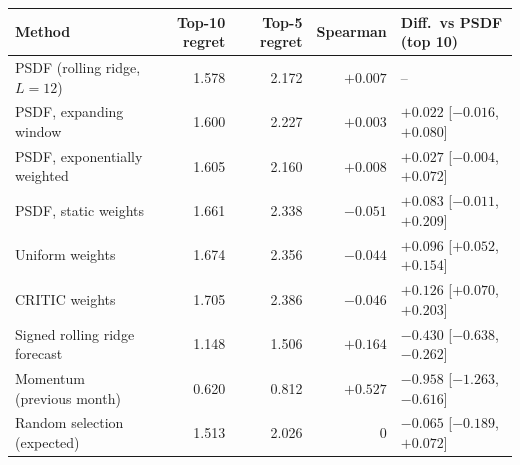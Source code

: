 \begin{tabular}{lrrrl}
\toprule
Method & Top-10 regret & Top-5 regret & Spearman & Diff.\ vs PSDF (top 10) \\
\midrule
PSDF (rolling ridge, $L=12$) & 1.578 & 2.172 & $+0.007$ & -- \\
PSDF, expanding window & 1.600 & 2.227 & $+0.003$ & $+0.022$ [$-0.016$, $+0.080$] \\
PSDF, exponentially weighted & 1.605 & 2.160 & $+0.008$ & $+0.027$ [$-0.004$, $+0.072$] \\
PSDF, static weights & 1.661 & 2.338 & $-0.051$ & $+0.083$ [$-0.011$, $+0.209$] \\
Uniform weights & 1.674 & 2.356 & $-0.044$ & $+0.096$ [$+0.052$, $+0.154$] \\
CRITIC weights & 1.705 & 2.386 & $-0.046$ & $+0.126$ [$+0.070$, $+0.203$] \\
Signed rolling ridge forecast & 1.148 & 1.506 & $+0.164$ & $-0.430$ [$-0.638$, $-0.262$] \\
Momentum (previous month) & 0.620 & 0.812 & $+0.527$ & $-0.958$ [$-1.263$, $-0.616$] \\
Random selection (expected) & 1.513 & 2.026 & 0 & $-0.065$ [$-0.189$, $+0.072$] \\
\bottomrule
\end{tabular}
